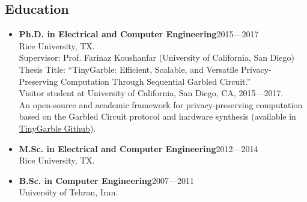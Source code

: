 \documentclass[overlapped]{res}
\begin{document}
\begin{resume}
\section{Education}
\begin{itemize}
\item {\bf Ph.D. in Electrical and Computer Engineering}\hfill  2015---2017\\
Rice University, TX.\\
Supervisor: Prof. Farinaz Koushanfar (University of California, San Diego)\\
Thesis Title: ``TinyGarble: Efficient, Scalable, and Versatile Privacy-Preserving Computation Through Sequential Garbled Circuit.''\\
Visitor student at University of California, San Diego, CA, 2015---2017. \\
An open-source and academic framework for privacy-preserving computation based on the Garbled Circuit protocol and hardware synthesis (available in \href{https://github.com/esonghori/TinyGarble}{TinyGarble Github}).
\item {\bf M.Sc. in Electrical and Computer Engineering}\hfill 2012---2014\\
Rice University, TX.
\item {\bf B.Sc. in Computer Engineering}\hfill 2007---2011\\
University of Tehran, Iran.
\end{itemize}


\end{resume}
\end{document}
